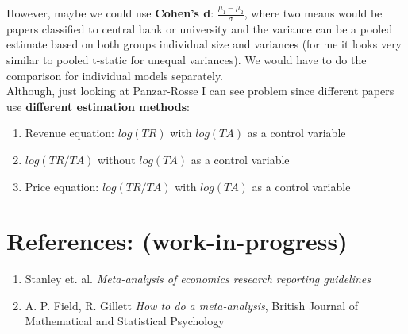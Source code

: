 \documentclass{article}
\begin{document}
\newline \noindent
However, maybe we could use \textbf{Cohen’s d}: $\frac{\mu_1 - \mu_2}{\sigma}$, where two means would be papers classified to central bank or university and the variance can be a pooled estimate based on both groups individual size and variances (for me it looks very similar to pooled t-static for unequal variances). We would have to do the comparison for individual models separately. \\

\newline \noindent
Although, just looking at Panzar-Rosse I can see problem since different papers use \textbf{different estimation methods}:
\begin{enumerate}
    \item Revenue equation: $log(TR)$ with $log(TA)$ as a control variable
    \item $log(TR/TA)$  without $log(TA)$ as a control variable
    \item Price equation: $log(TR/TA)$ with $log(TA)$ as a control variable
\end{enumerate}


\newpage

\section*{References: (work-in-progress)}

\begin{enumerate}
    \item Stanley et. al. \textit{Meta-analysis of economics research reporting guidelines}
    \item A. P. Field, R. Gillett \textit{How to do a meta-analysis}, British Journal of Mathematical and Statistical Psychology
\end{enumerate}
\end{document}
